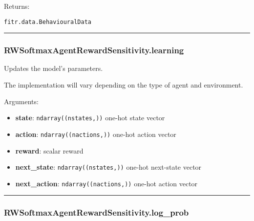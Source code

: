 Returns:

\texttt{fitr.data.BehaviouralData}

\begin{center}\rule{0.5\linewidth}{\linethickness}\end{center}

\hypertarget{rwsoftmaxagentrewardsensitivity.learning}{%
\subsubsection{RWSoftmaxAgentRewardSensitivity.learning}\label{rwsoftmaxagentrewardsensitivity.learning}}

\begin{Shaded}
\begin{Highlighting}[]
\end{Highlighting}
\end{Shaded}

Updates the model's parameters.

The implementation will vary depending on the type of agent and
environment.

Arguments:

\begin{itemize}
\tightlist
\item
  \textbf{state}: \texttt{ndarray((nstates,))} one-hot state vector
\item
  \textbf{action}: \texttt{ndarray((nactions,))} one-hot action vector
\item
  \textbf{reward}: scalar reward
\item
  \textbf{next\_state}: \texttt{ndarray((nstates,))} one-hot next-state
  vector
\item
  \textbf{next\_action}: \texttt{ndarray((nactions,))} one-hot action
  vector
\end{itemize}

\begin{center}\rule{0.5\linewidth}{\linethickness}\end{center}

\hypertarget{rwsoftmaxagentrewardsensitivity.log_prob}{%
\subsubsection{RWSoftmaxAgentRewardSensitivity.log\_prob}\label{rwsoftmaxagentrewardsensitivity.log_prob}}

\begin{Shaded}
\begin{Highlighting}[]
\end{Highlighting}
\end{Shaded}

